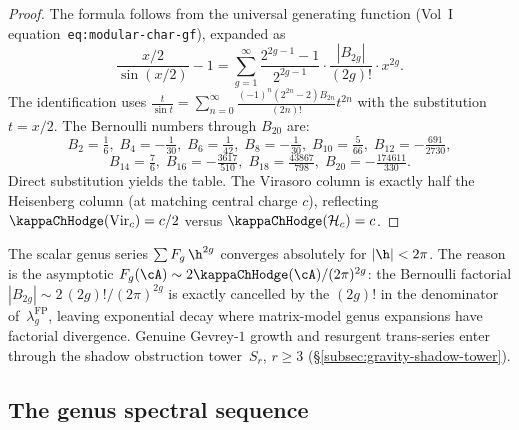 \begin{proof}
The formula follows from the universal generating function
(Vol~I equation~\texttt{eq:modular-char-gf}), expanded as
\[
\frac{x/2}{\sin(x/2)} - 1
= \sum_{g=1}^{\infty} \frac{2^{2g-1}-1}{2^{2g-1}} \cdot \frac{|B_{2g}|}{(2g)!} \cdot x^{2g}.
\]
The identification uses $\frac{t}{\sin t} = \sum_{n=0}^{\infty} \frac{(-1)^n(2^{2n}-2)B_{2n}}{(2n)!}t^{2n}$
with the substitution $t = x/2$. The Bernoulli numbers through $B_{20}$ are:
\[
B_2 = \tfrac{1}{6},\;
B_4 = -\tfrac{1}{30},\;
B_6 = \tfrac{1}{42},\;
B_8 = -\tfrac{1}{30},\;
B_{10} = \tfrac{5}{66},\;
B_{12} = -\tfrac{691}{2730},
\]
\[
B_{14} = \tfrac{7}{6},\;
B_{16} = -\tfrac{3617}{510},\;
B_{18} = \tfrac{43867}{798},\;
B_{20} = -\tfrac{174611}{330}.
\]
Direct substitution yields the table. The Virasoro column is exactly half the
Heisenberg column (at matching central charge $c$), reflecting $\kappaChHodge(\mathrm{Vir}_c) = c/2$
versus $\kappaChHodge(\mathcal{H}_c) = c$.
\end{proof}

\begin{remark}
The scalar genus series $\sum F_g\,\h^{2g}$ converges absolutely
for $|\h| < 2\pi$. The reason is the asymptotic
$F_g(\cA) \sim 2\kappaChHodge(\cA)/(2\pi)^{2g}$: the Bernoulli factorial
$|B_{2g}| \sim 2\,(2g)!/(2\pi)^{2g}$ is exactly cancelled by the
$(2g)!$ in the denominator of~$\lambda_g^{\mathrm{FP}}$, leaving
exponential decay where matrix-model genus expansions have
factorial divergence. Genuine Gevrey-$1$ growth and resurgent
trans-series enter through the shadow obstruction tower~$S_r$, $r \ge 3$
(\S\ref*{subsec:gravity-shadow-tower}).
\end{remark}

\subsection{The genus spectral sequence}

